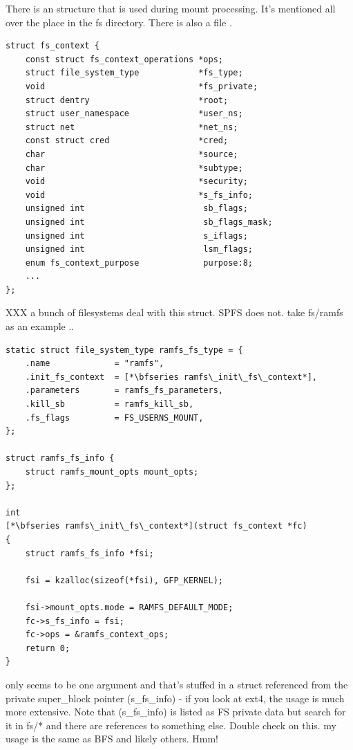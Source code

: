 There is an  structure that is used during mount processing. It's mentioned all over the place in the fs directory. There is also a file .

\begin{lstlisting}
struct fs_context {
    const struct fs_context_operations *ops;
    struct file_system_type            *fs_type;
    void                               *fs_private;
    struct dentry                      *root;
    struct user_namespace              *user_ns;
    struct net                         *net_ns;
    const struct cred                  *cred;
    char                               *source;
    char                               *subtype;
    void                               *security;
    void                               *s_fs_info;
    unsigned int                        sb_flags;
    unsigned int                        sb_flags_mask;
    unsigned int                        s_iflags;
    unsigned int                        lsm_flags;
    enum fs_context_purpose             purpose:8;
    ... 
};
\end{lstlisting}

\noindent
XXX a bunch of filesystems deal with this struct. SPFS does not. take fs/ramfs as an example .. 

\begin{lstlisting}
static struct file_system_type ramfs_fs_type = {
    .name             = "ramfs",
    .init_fs_context  = [*\bfseries ramfs\_init\_fs\_context*],
    .parameters       = ramfs_fs_parameters,
    .kill_sb          = ramfs_kill_sb,
    .fs_flags         = FS_USERNS_MOUNT,
};

struct ramfs_fs_info {
    struct ramfs_mount_opts mount_opts;
}; 

int 
[*\bfseries ramfs\_init\_fs\_context*](struct fs_context *fc)
{
    struct ramfs_fs_info *fsi;

    fsi = kzalloc(sizeof(*fsi), GFP_KERNEL);

    fsi->mount_opts.mode = RAMFS_DEFAULT_MODE;
    fc->s_fs_info = fsi;
    fc->ops = &ramfs_context_ops;
    return 0;
}
\end{lstlisting}

\noindent
only seems to be one argument and that's stuffed in a struct referenced from the private super\_block pointer (s\_fs\_info) - if you look at ext4, the usage is much more extensive. Note that (s\_fs\_info) is listed as FS private data but search for it in fs/* and there are references to something else. Double check on this. my usage is the same as BFS and likely others. Hmm!

